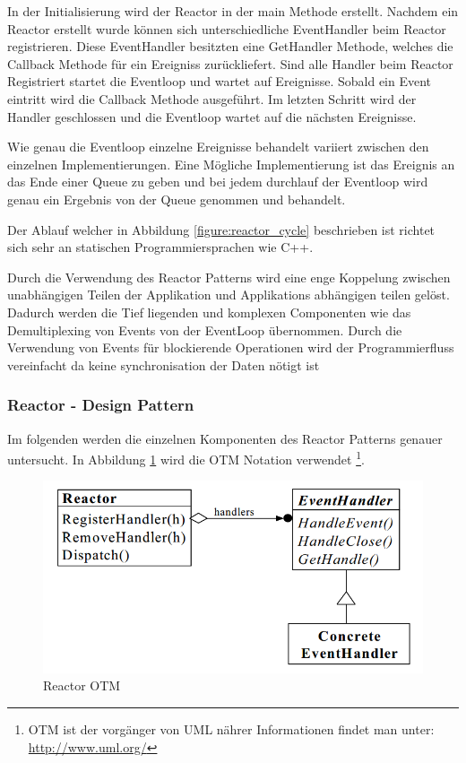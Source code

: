 In der Initialisierung wird der Reactor in der main Methode erstellt. Nachdem ein Reactor erstellt wurde können sich unterschiedliche EventHandler beim Reactor registrieren. Diese EventHandler besitzten eine GetHandler Methode, welches die Callback Methode für ein Ereigniss zurückliefert. Sind alle Handler beim Reactor Registriert startet die Eventloop und wartet auf Ereignisse. Sobald ein Event eintritt wird die Callback Methode ausgeführt. Im letzten Schritt wird der Handler geschlossen und die Eventloop wartet auf die nächsten Ereignisse. 

Wie genau die Eventloop einzelne Ereignisse behandelt variiert zwischen den einzelnen Implementierungen. Eine Mögliche Implementierung ist das Ereignis an das Ende einer Queue zu geben und bei jedem durchlauf der Eventloop wird genau ein Ergebnis von der Queue genommen und behandelt.

Der Ablauf welcher in Abbildung \ref{figure:reactor_cycle} beschrieben ist richtet sich sehr an statischen Programmiersprachen wie C++.

Durch die Verwendung des Reactor Patterns wird eine enge Koppelung zwischen unabhängigen Teilen der Applikation und Applikations abhängigen teilen gelöst. Dadurch werden die Tief liegenden und komplexen Componenten wie das Demultiplexing von Events von der EventLoop übernommen. Durch die Verwendung von Events für blockierende Operationen wird der Programmierfluss vereinfacht da keine synchronisation der Daten nötigt ist \cite[p. 2]{Sch95}

\subsubsection{Reactor - Design Pattern}

Im folgenden werden die einzelnen Komponenten des Reactor Patterns genauer untersucht. In Abbildung \ref{figure:reactor_otm} wird die OTM Notation verwendet \footnote[0]{OTM ist der vorgänger von UML nährer Informationen findet man unter: \url{http://www.uml.org/}}.

\begin{figure}[!htb]
  \centering
  \includegraphics[width=13cm]{images/reactor_otm.png}
  \caption{
    Reactor OTM \cite[p. 4]{Sch95}
  }
  \label{figure:reactor_otm}
\end{figure}

